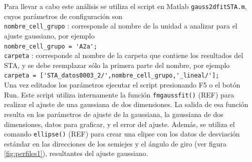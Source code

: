 \documentclass[10pt]{article}
\begin{document}
Para llevar a cabo este análisis se utiliza el script en Matlab \verb+gauss2dfitSTA.m+, cuyos parámetros de configuración son \\

\verb+nombre_cell_grupo+ : corresponde al nombre de la unidad a analizar para el ajuste gaussiano, por ejemplo \\

\verb+nombre_cell_grupo = 'A2a';+ \\

\verb+carpeta+ : corresponde al nombre de la carpeta que contiene los resultados del STA, y se debe reemplazar sólo la primera parte del nombre, por ejemplo \\

\verb+carpeta = ['STA_datos0003_2/',nombre_cell_grupo,'_lineal/'];+ \\

Una vez editados los parámetros ejecutar el script presionando F5 o el botón Run.
Este script utiliza internamente la función \verb+fmgaussfit()+ (REF) para realizar el ajuste de una gaussiana de dos dimensiones. La salida de esa función resulta en los parámetros de ajuste de la gaussiana, la gaussiana de dos dimensiones, datos para graficar, y el error del ajuste. Además, se utiliza el comando \verb+ellipse()+ (REF) para crear una elipse con los datos de desviación estándar en las direcciones de los semiejes y el ángulo de giro (ver figura \ref{fig:perfiles1}), resultantes del ajuste gaussiano. \\
\end{document}
